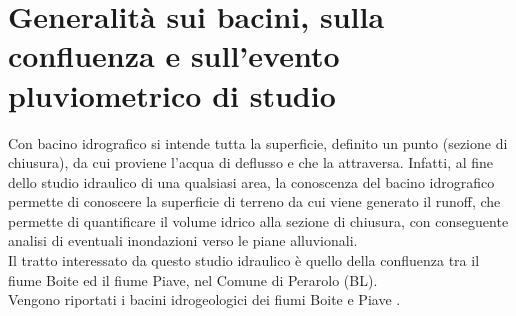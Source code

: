 \section{Generalità sui bacini, sulla confluenza e sull'evento pluviometrico di studio}
Con bacino idrografico si intende tutta la superficie, definito un punto (sezione di chiusura), da cui proviene l'acqua di deflusso e che la attraversa. Infatti, al fine dello studio idraulico di una qualsiasi area, la conoscenza del bacino idrografico permette di conoscere la superficie di terreno da cui viene generato il runoff, che permette di quantificare il volume idrico alla sezione di chiusura, con conseguente analisi di eventuali inondazioni verso le piane alluvionali.\\
Il tratto interessato da questo studio idraulico è quello della confluenza tra il fiume Boite ed il fiume Piave, nel Comune di Perarolo (BL).\\
Vengono riportati i bacini idrogeologici dei fiumi Boite \cite{fiume_boite} e Piave \cite{fiume_piave}.
